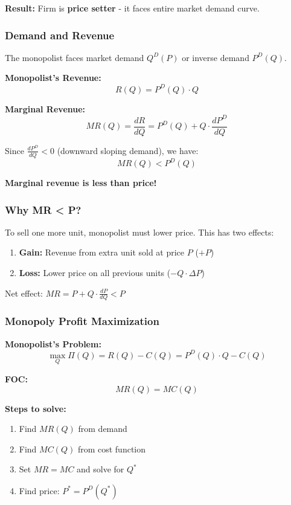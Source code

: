 \documentclass[10pt,letterpaper]{article}
\begin{document}
\textbf{Result:} Firm is \textbf{price setter} - it faces entire market demand curve.

\subsubsection{Demand and Revenue}

The monopolist faces market demand $Q^D(P)$ or inverse demand $P^D(Q)$.

\begin{formulabox}
\textbf{Monopolist's Revenue:}
\[
R(Q) = P^D(Q) \cdot Q
\]

\textbf{Marginal Revenue:}
\[
\boxed{MR(Q) = \frac{dR}{dQ} = P^D(Q) + Q \cdot \frac{dP^D}{dQ}}
\]

Since $\frac{dP^D}{dQ} < 0$ (downward sloping demand), we have:
\[
\boxed{MR(Q) < P^D(Q)}
\]

\textbf{Marginal revenue is less than price!}
\end{formulabox}

\subsubsection{Why MR < P?}

To sell one more unit, monopolist must lower price. This has two effects:
\begin{enumerate}
  \item \textbf{Gain:} Revenue from extra unit sold at price $P$ ($+P$)
  \item \textbf{Loss:} Lower price on all previous units ($-Q \cdot \Delta P$)
\end{enumerate}

Net effect: $MR = P + Q \cdot \frac{dP}{dQ} < P$

\subsubsection{Monopoly Profit Maximization}

\begin{formulabox}[colback=yellow!20,colframe=orange!80]
\textbf{Monopolist's Problem:}
\[
\max_Q \Pi(Q) = R(Q) - C(Q) = P^D(Q) \cdot Q - C(Q)
\]

\textbf{FOC:}
\[
\boxed{MR(Q) = MC(Q)}
\]

\textbf{Steps to solve:}
\begin{enumerate}
  \item Find $MR(Q)$ from demand
  \item Find $MC(Q)$ from cost function
  \item Set $MR = MC$ and solve for $Q^*$
  \item Find price: $P^* = P^D(Q^*)$
\end{enumerate}
\end{formulabox}
\end{document}
